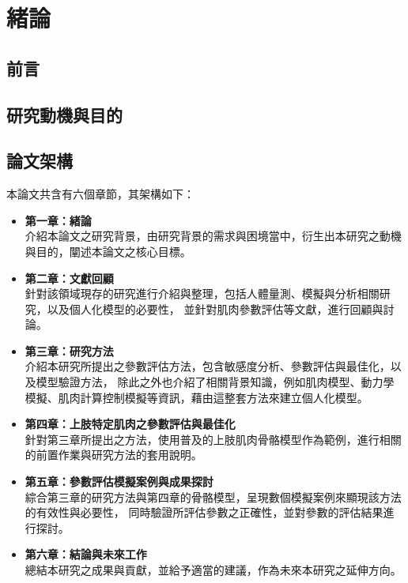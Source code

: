\chapter{緒論}
\fontsize{12pt}{18pt}\selectfont

\section{前言}



\section{研究動機與目的}


\section{論文架構}
本論文共含有六個章節，其架構如下：

\begin{itemize}
    \item \textbf{第一章：緒論}
    \\ 介紹本論文之研究背景，由研究背景的需求與困境當中，衍生出本研究之動機與目的，闡述本論文之核心目標。
    \item \textbf{第二章：文獻回顧}
    \\ 針對該領域現存的研究進行介紹與整理，包括人體量測、模擬與分析相關研究，以及個人化模型的必要性，
    並針對肌肉參數評估等文獻，進行回顧與討論。
    \item \textbf{第三章：研究方法}
    \\ 介紹本研究所提出之參數評估方法，包含敏感度分析、參數評估與最佳化，以及模型驗證方法，
    除此之外也介紹了相關背景知識，例如肌肉模型、動力學模擬、肌肉計算控制模擬等資訊，藉由這整套方法來建立個人化模型。
    \item \textbf{第四章：上肢特定肌肉之參數評估與最佳化}
    \\ 針對第三章所提出之方法，使用普及的上肢肌肉骨骼模型作為範例，進行相關的前置作業與研究方法的套用說明。
    \item \textbf{第五章：參數評估模擬案例與成果探討}
    \\ 綜合第三章的研究方法與第四章的骨骼模型，呈現數個模擬案例來顯現該方法的有效性與必要性，
    同時驗證所評估參數之正確性，並對參數的評估結果進行探討。
    \item \textbf{第六章：結論與未來工作}
    \\ 總結本研究之成果與貢獻，並給予適當的建議，作為未來本研究之延伸方向。
\end{itemize}

\clearpage
